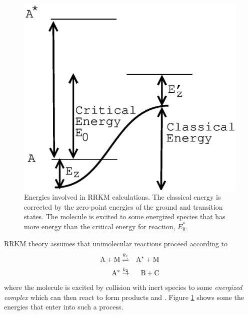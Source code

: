 \begin{figure}
\begin{center}
\includegraphics[scale=0.5]{rrkm.eps}
\end{center}
\caption{Energies involved in RRKM calculations. The classical energy
is corrected by the zero-point energies of the ground and transition
states. The molecule  is excited to some energized species
 that has more energy than the critical energy for reaction,
$E_0^*$.}
\label{rrkm}
\end{figure}

RRKM theory assumes that unimolecular reactions proceed according to
\begin{eqnarray}
 \mathrm{A} + \mathrm{M} &\stackrel{k_1}{\rightleftharpoons}& 
   \mathrm{A^*} + \mathrm{M}\\
 \mathrm{A^*} &\stackrel{k_2}{\rightarrow}& \mathrm{B}+\mathrm{C}
\end{eqnarray}
where the molecule  is excited by collision with inert species
 to some \emph{energized complex}  which can then
react to form products  and . Figure \ref{rrkm} shows
some the energies that enter into such a process.

